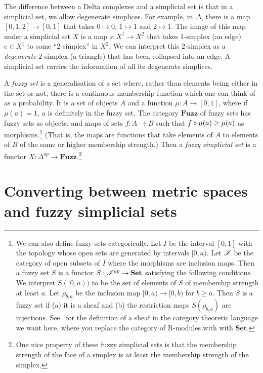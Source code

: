 \documentclass[a4paper,11pt,leqno]{article} \usepackage{amsmath}
\theoremstyle{definition}
\begin{document}
The difference between a Delta complexes and a simplicial set is that in
a simplicial set, we allow degenerate simplices.
For example, in $\Delta$,
there is a map $[0, 1, 2]\to [0, 1]$ that takes $0\mapsto 0$, $1\mapsto 1$ and
$2\mapsto 1$.
The image of this map under a simplicial set $X$ is a map $s:
X^1\to X^2$ that takes 1-simplex (an edge) $e\in X^1$ to some ``2-simplex'' in
$X^2$.
We can interpret this 2-simplex as a \emph{degenerate} 2-simplex (a
triangle) that has been collapsed into an edge.
A simplicial set carries the
information of all its degenerate simplices.

A \emph{fuzzy set} is a generalisation of a set where, rather than elements
being either in the set or not, there is a continuous membership function which
one can think of as a probability.
It is a set of objects $A$ and a function
$\mu: A\to [0, 1]$, where if $\mu(a) = 1$, $a$ is definitely in the fuzzy set.
The category $\textbf{Fuzz}$ of fuzzy sets has fuzzy sets as objects, and maps
of sets $f: A\to B$ such that $f\circ \mu(a) \geq \mu(a)$ as morphisms.\footnote{
  We can also define fuzzy sets categorically.
Let $I$ be the interval $[0, 1]$
  with the topology whose open sets are generated by intervals $[0, a)$.
Let
  $\mathscr{I}$ be the category of open subsets of $I$ where the morphisms are
  inclusion maps.
Then a fuzzy set $S$ is a functor $S: \mathscr{I}^{op}\to
  \textbf{Set}$ satisfying the following conditions.
We interpret $S([0, a))$ to
  be the set of elements of $S$ of membership strength at least $a$.
Let
  $\rho_{b, a}$ be the inclusion map $[0, a)\to [0, b)$ for $b\geq a$.
Then $S$
  is a fuzzy set if (a) it is a sheaf and (b) the restriction maps $S(\rho_{b,
  a})$ are injections.
See~\cite{Weng} for the definition of a sheaf in the
  category theoretic language we want here, where you replace the category of
  R-modules with with $\textbf{Set}$.} (That is, the maps are functions that
take elements of $A$ to elements of $B$ of the same or higher membership
strength.) Then a \emph{fuzzy simplicial set} is a functor $X: \Delta^{op}\to
\textbf{Fuzz}$.\footnote{ One nice property of these fuzzy simplicial sets is
that the membership strength of the face of a simplex is at least the membership
strength of the simplex.}

\section{Converting between metric spaces and fuzzy simplicial sets}
\label{section_adjunction}
\end{document}
